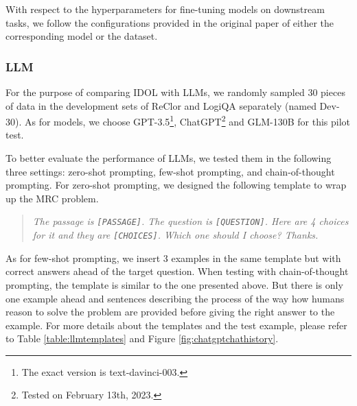 \documentclass[11pt]{article}
\begin{document}
With respect to the hyperparameters for fine-tuning models on downstream tasks, we follow the configurations provided in the original paper of either the corresponding model or the dataset.

\subsubsection{LLM} \label{llmimpledetail}
For the purpose of comparing IDOL with LLMs, we randomly sampled 30 pieces of data in the development sets of ReClor and LogiQA separately (named Dev-30). As for models, we choose GPT-3.5\footnote{The exact version is text-davinci-003.}, ChatGPT\footnote{Tested on February 13th, 2023.} and GLM-130B \cite{glm130b} for this pilot test.

To better evaluate the performance of LLMs, we tested them in the following three settings: zero-shot prompting, few-shot prompting, and chain-of-thought prompting. For zero-shot prompting, we designed the following template to wrap up the MRC problem.

\begin{quote}\small
\textit{The passage is \texttt{[PASSAGE]}. The question is \texttt{[QUESTION]}. Here are 4 choices for it and they are \texttt{[CHOICES]}. Which one should I choose? Thanks.} 
\end{quote}

As for few-shot prompting, we insert 3 examples in the same template but with correct answers ahead of the target question. When testing with chain-of-thought prompting, the template is similar to the one presented above. But there is only one example ahead and sentences describing the process of the way how humans reason to solve the problem are provided before giving the right answer to the example. For more details about the templates and the test example, please refer to Table \ref{table:llmtemplates} and Figure \ref{fig:chatgptchathistory}.
\end{document}
